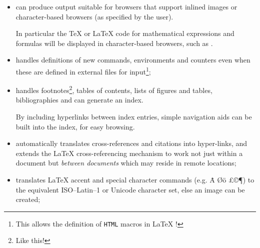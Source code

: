 \begin{itemize}
%
%
\item
can produce output suitable for browsers that support inlined images
or character-based browsers (as specified by the user).
\begin{changebar}
In particular the \TeX{} or \LaTeX{} code for mathematical expressions
and formulas will be displayed in character-based browsers,
such as .
\end{changebar}

%
%
%

%
%
%
\item
handles definitions of new commands, environments and counters
even when these are defined in external files for input\footnote{%
This allows the definition of \texttt{HTML} macros in \LaTeX{} !};

%
%
\item
handles footnotes\footnote{Like this!},
tables of contents, lists of figures and tables,
bibliographies and can generate an index.
\begin{changebar}%
By including hyperlinks between index entries,
simple navigation aids can be built into the index, for easy browsing.
\end{changebar}

%
%
\item
automatically translates cross-references and citations into hyper-links,
and extends the \LaTeX{}  cross-referencing mechanism to work
not just within a document but \emph{between documents}
which may reside in remote locations;

%
%
%
%
\item
translates \LaTeX{}  accent and special character
commands (e.g. \. {A} \O {\"o} \pounds \copyright \P) to
the equivalent ISO--Latin--1 or Unicode character set,
else an image can be created;


\end{itemize}
